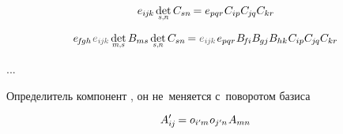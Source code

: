 \[
e_{i\hspace{-0.1ex}j\hspace{-0.1ex}k} \hspace{.33ex} \underset{\raisebox{.15em}{\scalebox{.7}{$s$,$n$}}}{\operatorname{det}} \, C_{sn} \hspace{-0.2ex}
= e_{pqr} \hspace{.1ex} C_{ip} C_{\hspace{-0.1ex}j\hspace{-0.1ex}q} C_{kr}
\hspace{-0.2ex}
\]

\[
e_{\hspace{-0.25ex}f\hspace{-0.2ex}gh} \hspace{.2ex} \mathcolor{black!66}{e_{i\hspace{-0.1ex}j\hspace{-0.1ex}k}} \hspace{.33ex} \underset{\raisebox{.15em}{\scalebox{.7}{$m$,$s$}}}{\operatorname{det}} \, \somematrixelements{ms} \hspace{.33ex} \underset{\raisebox{.15em}{\scalebox{.7}{$s$,$n$}}}{\operatorname{det}} \, C_{sn} \hspace{-0.2ex}
= \mathcolor{black!66}{e_{i\hspace{-0.1ex}j\hspace{-0.1ex}k}} \hspace{.2ex} e_{pqr} \hspace{.1ex} \somematrixelements{\hspace{-0.25ex}f\hspace{-0.1ex}i} \somematrixelements{\hspace{-0.1ex}gj} \somematrixelements{hk} \hspace{.1ex} C_{ip} C_{\hspace{-0.1ex}j\hspace{-0.1ex}q} C_{kr}
\hspace{-0.2ex}
\]

...

\begin{otherlanguage}{russian}

Определитель
компонент
,
он
не~меняется
с~поворотом базиса

\end{otherlanguage}

\nopagebreak\vspace{-0.2em}\begin{equation*}
A'_{i\hspace{-0.1ex}j} \hspace{-0.16ex} = o_{i'\hspace{-0.1ex}m} \hspace{.1ex} o_{j'\hspace{-0.1ex}n} \hspace{.16ex} A_{mn}
\end{equation*}
